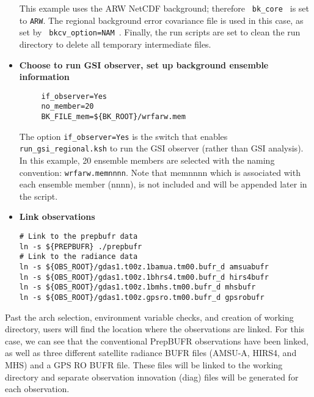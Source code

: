 \begin{itemize}
This example uses the ARW NetCDF background; therefore \verb| bk_core | is set to \verb|ARW|. The regional background error covariance file is used in this case, as set by \verb| bkcv_option=NAM |. Finally, the run scripts are set to clean the run directory to delete all temporary intermediate files.\\

\item \textbf{Choose to run GSI observer, set up background ensemble information}

\begin{footnotesize}
\begin{verbatim}
     if_observer=Yes
     no_member=20 
     BK_FILE_mem=${BK_ROOT}/wrfarw.mem
\end{verbatim}
\end{footnotesize}

The option \verb|if_observer=Yes| is the switch that enables \verb|run_gsi_regional.ksh| to run the GSI observer (rather than GSI analysis). In this example, 20 ensemble members are selected with the naming convention: 
\verb|wrfarw.memnnnn|. Note that memnnnn which is associated with each ensemble member (nnnn), is not included and will be appended later in the script.\\

\item \textbf{Link observations} 

\begin{footnotesize}
\begin{verbatim}
# Link to the prepbufr data
ln -s ${PREPBUFR} ./prepbufr
# Link to the radiance data
ln -s ${OBS_ROOT}/gdas1.t00z.1bamua.tm00.bufr_d amsuabufr 
ln -s ${OBS_ROOT}/gdas1.t00z.1bhrs4.tm00.bufr_d hirs4bufr 
ln -s ${OBS_ROOT}/gdas1.t00z.1bmhs.tm00.bufr_d mhsbufr
ln -s ${OBS_ROOT}/gdas1.t00z.gpsro.tm00.bufr_d gpsrobufr
\end{verbatim}
\end{footnotesize}

\end{itemize}

Past the arch selection, environment variable checks, and creation of working directory, users will find the location where the observations are linked. For this case, we can see that the conventional PrepBUFR observations have been linked, as well as three different satellite radiance BUFR files (AMSU-A, HIRS4, and MHS) and a GPS RO BUFR file. These files will be linked to the working directory and separate observation innovation (diag) files will be generated for each observation.

